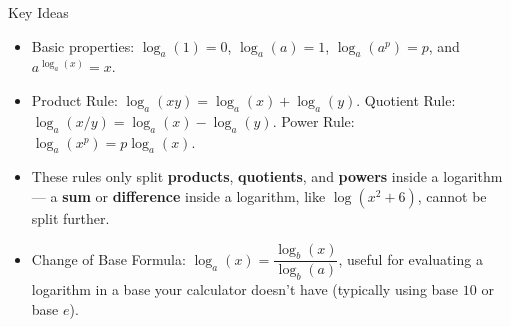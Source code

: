 \documentclass[12pt]{article}
\begin{document}
\begin{friendlyrule}{Key Ideas}
\begin{itemize}
    \item Basic properties: $\log_a(1)=0$, $\log_a(a)=1$, $\log_a(a^p)=p$, and $a^{\log_a(x)}=x$.
    \item Product Rule: $\log_a(xy)=\log_a(x)+\log_a(y)$. \quad Quotient Rule: $\log_a(x/y)=\log_a(x)-\log_a(y)$. \quad Power Rule: $\log_a(x^p)=p\log_a(x)$.
    \item These rules only split \textbf{products}, \textbf{quotients}, and \textbf{powers} inside a logarithm --- a \textbf{sum} or \textbf{difference} inside a logarithm, like $\log(x^2+6)$, cannot be split further.
    \item Change of Base Formula: $\log_a(x)=\dfrac{\log_b(x)}{\log_b(a)}$, useful for evaluating a logarithm in a base your calculator doesn't have (typically using base $10$ or base $e$).
\end{itemize}
\end{friendlyrule}
\end{document}
